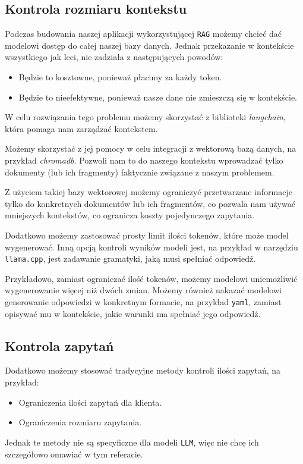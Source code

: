 \documentclass[12pt,aspectratio=169]{beamer}
\begin{document}
\subsection{Kontrola rozmiaru kontekstu}
\begin{frame}
Podczas budowania naszej aplikacji wykorzystującej \texttt{RAG} możemy chcieć
dać modelowi dostęp do całej naszej bazy danych. Jednak przekazanie w kontekście
wszystkiego jak leci, nie zadziała z następujących powodów:

\begin{itemize}
  \item Będzie to kosztowne, ponieważ płacimy za każdy token.
  \item Będzie to nieefektywne, ponieważ nasze dane nie zmieszczą się w
    kontekście.
\end{itemize}
\end{frame}
\begin{frame}
W celu rozwiązania tego problemu możemy skorzystać z biblioteki
\emph{langchain}, która pomaga nam zarządzać kontekstem. 

Możemy skorzystać z jej pomocy w celu integracji z wektorową bazą danych, na
przykład \emph{chromadb}. Pozwoli nam to do naszego kontekstu wprowadzać tylko
dokumenty (lub ich fragmenty) faktycznie związane z naszym problemem.

Z użyciem takiej bazy wektorowej możemy ograniczyć przetwarzane informacje tylko
do konkretnych dokumentów lub ich fragmentów, co pozwala nam używać mniejszych
kontekstów, co ogranicza koszty pojedynczego zapytania.
\end{frame}
\begin{frame}
Dodatkowo możemy zastosować prosty limit ilości tokenów, które może model
wygenerować. Inną opcją kontroli wyników modeli jest, na przykład w narzędziu
\texttt{llama.cpp}, jest zadawanie gramatyki, jaką musi spełniać odpowiedź.

Przykładowo, zamiast ograniczać ilość tokenów, możemy modelowi uniemożliwić
wygenerowanie więcej niż dwóch zmian. Możemy również nakazać modelowi
generowanie odpowiedzi w konkretnym formacie, na przykład \texttt{yaml}, zamiast
opisywać mu w kontekście, jakie warunki ma spełniać jego odpowiedź.
\end{frame}

\subsection{Kontrola zapytań}
\begin{frame}
Dodatkowo możemy stosować tradycyjne metody kontroli ilości zapytań, na
przykład:

\begin{itemize}
  \item Ograniczenia ilości zapytań dla klienta.
  \item Ograniczenia rozmiaru zapytania.
\end{itemize}

Jednak te metody nie są specyficzne dla modeli \texttt{LLM}, więc nie chcę ich
szczegółowo omawiać w tym referacie.
\end{frame}
\end{document}

